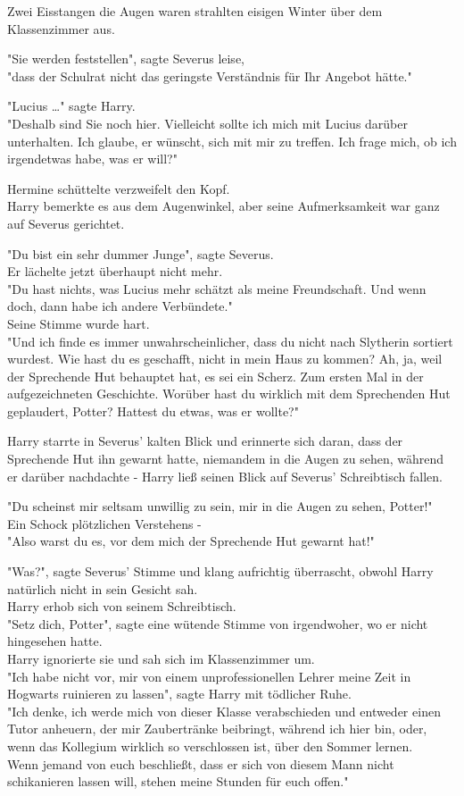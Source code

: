 {Zwei Eisstangen die Augen waren strahlten eisigen Winter über dem Klassenzimmer aus.

"Sie werden feststellen", sagte Severus leise,\\ "dass der Schulrat nicht das geringste Verständnis für Ihr Angebot hätte."

"Lucius …" sagte Harry.\\ "Deshalb sind Sie noch hier. Vielleicht sollte ich mich mit Lucius darüber unterhalten. Ich glaube, er wünscht, sich mit mir zu treffen. Ich frage mich, ob ich irgendetwas habe, was er will?"

Hermine schüttelte verzweifelt den Kopf.\\ Harry bemerkte es aus dem Augenwinkel, aber seine Aufmerksamkeit war ganz auf Severus gerichtet.

"Du bist ein sehr dummer Junge", sagte Severus.\\ Er lächelte jetzt überhaupt nicht mehr.\\ "Du hast nichts, was Lucius mehr schätzt als meine Freundschaft. Und wenn doch, dann habe ich andere Verbündete."\\ Seine Stimme wurde hart.\\ "Und ich finde es immer unwahrscheinlicher, dass du nicht nach Slytherin sortiert wurdest. Wie hast du es geschafft, nicht in mein Haus zu kommen? Ah, ja, weil der Sprechende Hut behauptet hat, es sei ein Scherz. Zum ersten Mal in der aufgezeichneten Geschichte. Worüber hast du wirklich mit dem Sprechenden Hut geplaudert, Potter? Hattest du etwas, was er wollte?"

Harry starrte in Severus' kalten Blick und erinnerte sich daran, dass der Sprechende Hut ihn gewarnt hatte, niemandem in die Augen zu sehen, während er darüber nachdachte - Harry ließ seinen Blick auf Severus' Schreibtisch fallen.

"Du scheinst mir seltsam unwillig zu sein, mir in die Augen zu sehen, Potter!"\\ Ein Schock plötzlichen Verstehens -\\ "Also warst du es, vor dem mich der Sprechende Hut gewarnt hat!"

"Was?", sagte Severus' Stimme und klang aufrichtig überrascht, obwohl Harry natürlich nicht in sein Gesicht sah.\\ Harry erhob sich von seinem Schreibtisch.\\ "Setz dich, Potter", sagte eine wütende Stimme von irgendwoher, wo er nicht hingesehen hatte.\\ Harry ignorierte sie und sah sich im Klassenzimmer um.\\ "Ich habe nicht vor, mir von einem unprofessionellen Lehrer meine Zeit in Hogwarts ruinieren zu lassen", sagte Harry mit tödlicher Ruhe.\\ "Ich denke, ich werde mich von dieser Klasse verabschieden und entweder einen Tutor anheuern, der mir Zaubertränke beibringt, während ich hier bin, oder, wenn das Kollegium wirklich so verschlossen ist, über den Sommer lernen.\\ Wenn jemand von euch beschließt, dass er sich von diesem Mann nicht schikanieren lassen will, stehen meine Stunden für euch offen."

}
